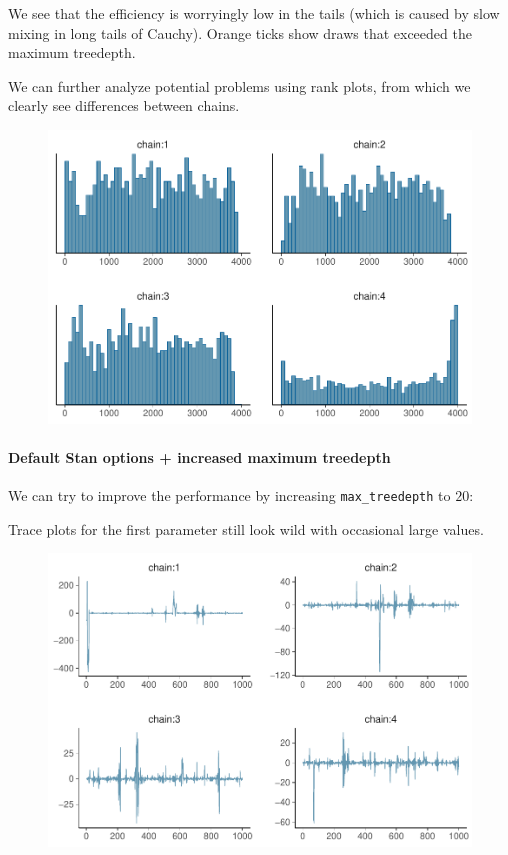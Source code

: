 \documentclass[american,]{article}
\let\oldparagraph\paragraph
\renewcommand{\paragraph}[1]{\oldparagraph{#1}\mbox{}}
\begin{document}
We see that the efficiency is worryingly low in the tails (which is
caused by slow mixing in long tails of Cauchy). Orange ticks show draws
that exceeded the maximum treedepth.

We can further analyze potential problems using rank plots, from which
we clearly see differences between chains.

\begin{figure}[t]
  \centering
  \includegraphics[width=0.6\linewidth]{graphics/hist-fit-nom-2-1.pdf}
\end{figure}

\hypertarget{default-stan-options-increased-maximum-treedepth}{%
\paragraph{Default Stan options + increased maximum
treedepth}\label{default-stan-options-increased-maximum-treedepth}}

We can try to improve the performance by increasing
\texttt{max\_treedepth} to \(20\):

Trace plots for the first parameter still look wild with occasional
large values.

\begin{figure}[t]
  \centering
  \includegraphics[width=0.6\linewidth]{graphics/trace-fit-nom-td20-1.pdf}
\end{figure}
\end{document}
